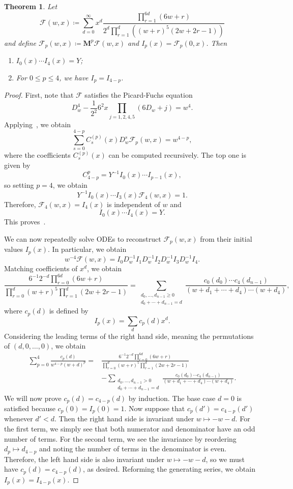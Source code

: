 \documentclass[10pt]{amsart}
\newtheorem{thm}{Theorem}[section]
\theoremstyle{definition}
\theoremstyle{remark}
\theoremstyle{plain}
\theoremstyle{definition}
\theoremstyle{remark}
\newcommand{\msc}[1]{\mathscr{#1}}
\newcommand{\mbf}[1]{\mathbf{#1}}
\newcommand{\1}{\mathbf{1}}
\newcommand{\2}{\mathbf{2}}
\newcommand{\3}{\mathbf{3}}
\numberwithin{equation}{section}
\begin{document}
\begin{thm}
  Let
  \[ \msc{F}(w,x) \coloneqq \sum_{d=0}^{\infty} x^d \frac{\prod_{r=1}^{6d} (6w+r)}{2^d\prod_{r=1}^d ((w+r)^5(2w+2r-1))} \]
  and define $\msc{F}_p(w,x) \coloneqq \mbf{M}^p \msc{F}(w,x)$ and $I_p(x) = \msc{F}_p(0,x)$. Then
  \begin{enumerate}
    \item $I_0(x) \cdots I_4(x) = Y$;
    \item For $0 \leq p \leq 4$, we have $I_p = I_{4-p}$.
  \end{enumerate}
\end{thm}

\begin{proof}
  First, note that $\msc{F}$ satisfies the Picard-Fuchs equation
  \[ D_w^4 - \frac{1}{2^2} 6^2 x \prod_{j=1,2,4,5}(6 D_w + j) = w^4. \]
  Applying~\cite[Corollary 1]{zagierzinger}, we obtain
  \[ \sum_{s=0}^{4-p} C_s^{(p)}(x) D_w^s \msc{F}_p(w,x) = w^{4-p}, \]
  where the coefficients $C_s^{(p)}(x)$ can be computed recursively. The top one is given by
  \[ C_{4-p}^p = Y^{-1} I_0(x) \cdots I_{p-1}(x), \]
  so setting $p=4$, we obtain
  \[ Y^{-1} I_0(x) \cdots I_3(x) \msc{F}_4(w,x) = 1. \]
  Therefore, $\msc{F}_4(w,x) = I_4(x)$ is independent of $w$ and
  \[ I_0(x) \cdots I_4(x) = Y. \]
  This proves~.

  We can now repeatedly solve ODEs to reconstruct $\msc{F}_p(w,x)$ from their initial values $I_p(x)$. In particular, we obtain
  \[ w^{-4}\msc{F}(w,x) = I_0 D_w^{-1}I_1 D_w^{-1}I_2 D_w^{-1}I_3 D_w^{-1}I_4. \]
  Matching coefficients of $x^d$, we obtain
  \[\frac{6^{-1} 2^{-d} \prod_{r=0}^{6d}(6w+r)}{\prod_{r=0}^d (w+r)^5 \prod_{r=1}^d(2w+2r-1)} = \sum_{\substack{d_0,\ldots,d_{n-1} \geq 0 \\ d_0 + \cdots + d_{n-1}=d}} \frac{c_0(d_0) \cdots c_4(d_{n-1})}{(w+d_1 + \cdots + d_{4})\cdots(w+d_{4})},\]
  where $c_p(d)$ is defined by
  \[ I_p(x) = \sum_d c_p(d) x^d. \]
  Considering the leading terms of the right hand side, meaning the permutations of $(d,0,\ldots,0)$, we obtain
  \begin{align*}
    \sum_{p=0}^4 \frac{c_p(d)}{w^{4-p}(w+d)^p} =&{}\frac{6^{-1} 2^{-d} \prod_{r=0}^{6d}(6w+r)}{\prod_{r=0}^d (w+r)^5 \prod_{r=1}^d(2w+2r-1)} \\
    &- \sum_{\substack{d_0,\ldots,d_{n-1} > 0 \\ d_0 + \cdots + d_{n-1}=d}} \frac{c_0(d_0) \cdots c_4(d_{n-1})}{(w+d_1 + \cdots + d_{4})\cdots(w+d_{4})}.
  \end{align*}
  We will now prove $c_p(d) = c_{4-p}(d)$ by induction. The base case $d=0$ is satisfied because $c_p(0) = I_p(0) = 1$. Now suppose that $c_p(d') = c_{4-p}(d')$ whenever $d' < d$. Then the right hand side is invariant under $w \mapsto -w-d$. For the first term, we simply see that both numerator and denominator have an odd number of terms. For the second term, we see the invariance by reordering $d_p \mapsto d_{4-p}$ and noting the number of terms in the denominator is even. Therefore, the left hand side is also invariant under $w \mapsto -w-d$, so we must have $c_p(d) = c_{4-p}(d)$, as desired. Reforming the generating series, we obtain $I_p(x) = I_{4-p}(x)$.
\end{proof}
\end{document}
